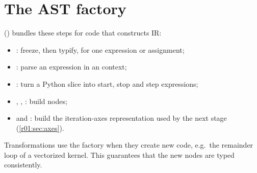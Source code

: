 \section{The AST factory}

 () bundles these steps for code that constructs IR:
\begin{itemize}
  \item {}: freeze, then typify, for one expression or assignment;
  \item {}: parse an expression in an  context;
  \item {}: turn a Python slice into start, stop
        and step expressions;
  \item {}, ,
        : build  nodes;
  \item {} and : build the
        iteration-axes representation used by the next stage (\cref{r01:sec:axes}).
\end{itemize}
Transformations use the factory when they create new code, e.g.\ the remainder loop of a
vectorized kernel. This guarantees that the new nodes are typed consistently.
